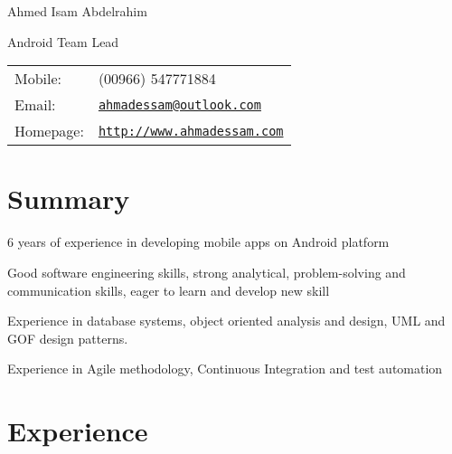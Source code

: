 \documentclass[letterpaper]{article}
\def\name{Ahmed Isam Abdelrahim}
\renewenvironment{itemize}{
  \begin{list}{}{
    \setlength{\leftmargin}{1.5em}
  }
}{
  \end{list}
}
\begin{document}
{\huge \name}


\vspace{0.10in}

\begin{minipage}{0.45\linewidth}
  Android Team Lead \\
 
\end{minipage}
\begin{minipage}{0.45\linewidth}
  \begin{tabular}{ll}
    Mobile: & (00966) 547771884 \\
    Email: & \href{mailto:ahmadessam@outlook.com}{\tt ahmadessam@outlook.com} \\
    Homepage: & \href{http://www.ahmadessam.com}{\tt http://www.ahmadessam.com} \\
  \end{tabular}
\end{minipage}

\section*{Summary}
\begin{itemize}
\item 6 years of experience in developing mobile apps on Android platform
\item Good software engineering skills, strong analytical, problem-solving and communication skills, eager to learn and develop new skill
\item Experience in database systems, object oriented analysis and design, UML and GOF design patterns.
\item Experience in Agile methodology, Continuous Integration and test automation
\end{itemize}


\section*{Experience}
\end{document}
